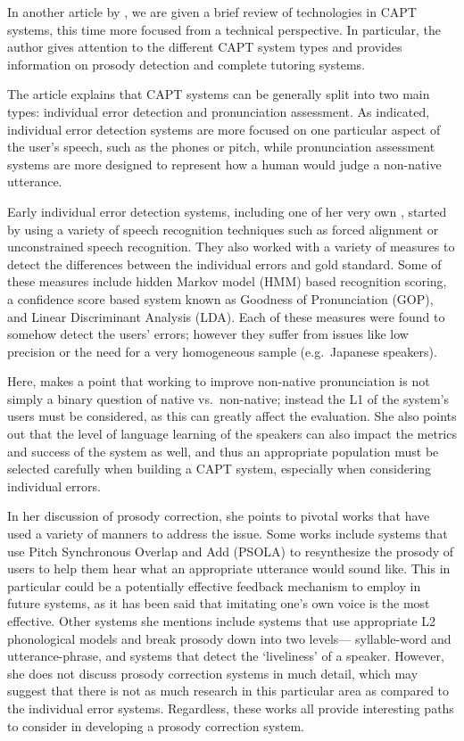 \documentclass
[
    a4paper,
    twoside,
    12pt
]
{report}
\begin{document}
In another article by \textcite{eskenazi2009}, we are given a brief
review of technologies in CAPT systems, this time more focused from a
technical perspective. In particular, the author gives attention to the
different CAPT system types and provides information on prosody
detection and complete tutoring systems.

The article explains that CAPT systems can be generally split into two
main types: individual error detection and pronunciation assessment. As
indicated, individual error detection systems are more focused on one
particular aspect of the user's speech, such as the phones or pitch,
while pronunciation assessment systems are more designed to represent
how a human would judge a non-native utterance.

Early individual error detection systems, including one of her very own
\textcite{eskenazi1998}, started by using a variety of speech
recognition techniques such as forced alignment or unconstrained speech
recognition. They also worked with a variety of measures to detect the
differences between the individual errors and gold standard. Some of
these measures include hidden Markov model (HMM) based recognition
scoring, a confidence score based system known as Goodness of
Pronunciation (GOP), and Linear Discriminant Analysis (LDA). Each of
these measures were found to somehow detect the users' errors; however
they suffer from issues like low precision or the need for a very
homogeneous sample (e.g.~Japanese speakers).

Here, \textcite{eskenazi2009} makes a point that working to improve
non-native pronunciation is not simply a binary question of native
vs.~non-native; instead the L1 of the system's users must be considered,
as this can greatly affect the evaluation. She also points out that the
level of language learning of the speakers can also impact the metrics
and success of the system as well, and thus an appropriate population
must be selected carefully when building a CAPT system, especially when
considering individual errors.

In her discussion of prosody correction, she points to pivotal works
that have used a variety of manners to address the issue. Some works
include systems that use Pitch Synchronous Overlap and Add (PSOLA) to
resynthesize the prosody of users to help them hear what an appropriate
utterance would sound like. This in particular could be a potentially
effective feedback mechanism to employ in future systems, as it has been
said that imitating one's own voice is the most effective. Other systems
she mentions include systems that use appropriate L2 phonological models
and break prosody down into two levels--- syllable-word and
utterance-phrase, and systems that detect the `liveliness' of a speaker.
However, she does not discuss prosody correction systems in much detail,
which may suggest that there is not as much research in this particular
area as compared to the individual error systems. Regardless, these
works all provide interesting paths to consider in developing a prosody
correction system.
\end{document}
